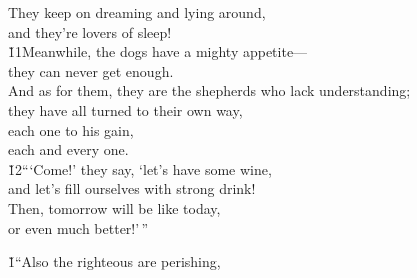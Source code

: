 \begin{poetry}
\poeml They keep on dreaming and lying around, \\
\poemll    and they're lovers of sleep! \\
\poeml \v{11}Meanwhile, the dogs have a mighty appetite--- \\
\poemll    they can never get enough. \\
\poeml And as for them, they are the shepherds who lack understanding; \\
\poemll    they have all turned to their own way, \\
\poeml each one to his gain, \\
\poemll    each and every one. \\
\poeml \v{12}```Come!' they say, `let's have some wine, \\
\poemll    and let's fill ourselves with strong drink! \\
\poeml Then, tomorrow will be like today, \\
\poemll    or even much better!'\,''
\end{poetry}

\v{1}``Also the righteous are perishing,

